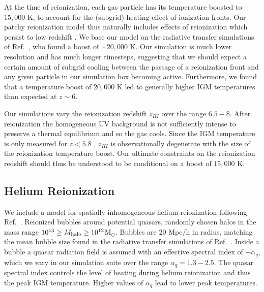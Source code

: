 \documentclass[a4paper,11pt]{article}
\begin{document}
At the time of reionization, each gas particle has its temperature boosted to $15,000$ K, to account for the (subgrid) heating effect of ionization fronts. Our patchy reionization model thus naturally includes effects of reionization which persist to low redshift \citep{Montero:2019}.
We base our model on the radiative transfer simulations of Ref.~\citep{DAloisio:2019}, who found a boost of $\sim 20,000$ K. Our simulation is much lower resolution and has much longer timesteps, suggesting that we should expect a certain amount of subgrid cooling between the passage of a reionization front and any given particle in our simulation box becoming active. Furthermore, we found that a temperature boost of $20,000$ K led to generally higher IGM temperatures than expected at $z\sim 6$.

Our simulations vary the reionization redshift $z_{HI}$ over the range $6.5 - 8$. After reionization the homogeneous UV background is not sufficiently intense to preserve a thermal equilibrium and so the gas cools. Since the IGM temperature is only measured for $z < 5.8$ \cite{Gaikwad:2020}, $z_{HI}$ is observationally degenerate with the size of the reionization temperature boost. Our ultimate constraints on the reionization redshift should thus be understood to be conditional on a boost of $15,000$ K.




\subsection{Helium Reionization}
\label{sec:helium}

We include a model for spatially inhomogeneous helium reionization following Ref.~\cite{UptonSanderbeck:2020}. Reionized bubbles around potential quasars, randomly chosen halos in the mass range $10^{13} \geq M_{\rm halo}\geq 10^{12}$M$_{\odot}$. Bubbles are $20$ Mpc/h in radius, matching the mean bubble size found in the radiative transfer simulations of Ref.~\citep{McQuinn:2009}. Inside a bubble a quasar radiation field is assumed with an effective spectral index of $ - \alpha_q$, which we vary in our simulation suite over the range $\alpha_q  = 1.3 - 2.5$. The quasar spectral index controls the level of heating during helium reionization and thus the peak IGM temperature. Higher values of $\alpha_q$ lead to lower peak temperatures.
\end{document}
